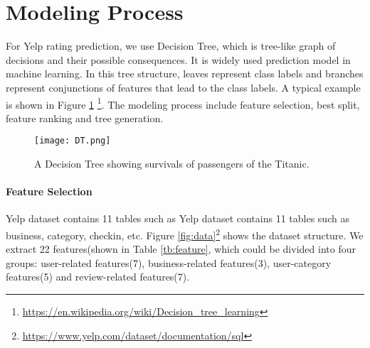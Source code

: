 \section{Modeling Process}
\label{sec:modeling} 


For Yelp rating prediction, we use Decision Tree, which is tree-like graph of decisions and their possible consequences. It is widely used prediction model in machine learning. In this tree structure, leaves represent class labels and branches represent conjunctions of features that lead to the class labels. A typical example is shown in Figure \ref{fig:DT} \footnote{\url{https://en.wikipedia.org/wiki/Decision_tree_learning}}. The modeling process include feature selection, best split, feature ranking and tree generation. 

\begin{figure}[h]
	\centering
	\texttt{[image: DT.png]}
	\caption{A Decision Tree showing survivals of passengers of the Titanic.}
	\label{fig:DT}
\end{figure}


\paragraph{Feature Selection}
Yelp dataset contains 11 tables such as Yelp dataset contains 11 tables such as business, category, checkin, etc. Figure \ref{fig:data}\footnote{\url{https://www.yelp.com/dataset/documentation/sql}} shows the dataset structure. We extract 22 features(shown in Table \ref{tb:feature}, which could be divided into four groups: user-related features(7), business-related features(3), user-category features(5) and review-related features(7).


